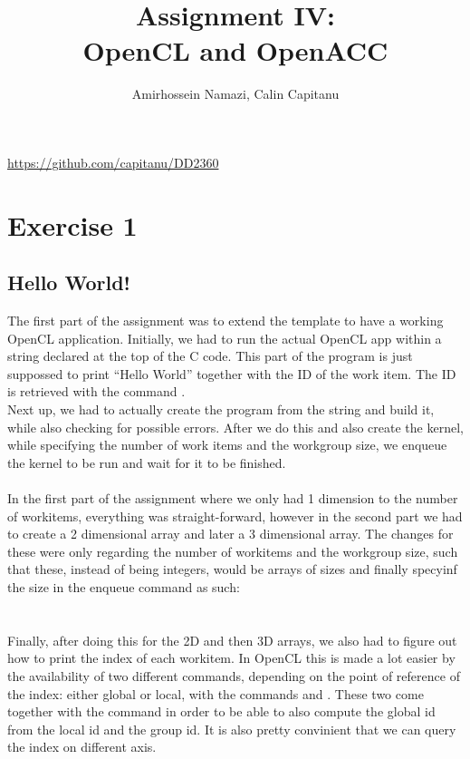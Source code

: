 \documentclass[english]{exam}
\begin{document}
\title{Assignment IV:\\ OpenCL and OpenACC}
\author{Amirhossein Namazi, Calin Capitanu}

\maketitle
\begin{center}
  \url{https://github.com/capitanu/DD2360} \\
\end{center}

\chapter{Exercise 1}
\section*{Hello World!}

The first part of the assignment was to extend the template to have a working OpenCL application. Initially, we had to run the actual OpenCL app within a string declared at the top of the C code. This part of the program is just suppossed to print ``Hello World'' together with the ID of the work item. The ID is retrieved with the command . \\
Next up, we had to actually create the program from the string and build it, while also checking for possible errors. After we do this and also create the kernel, while specifying the number of work items and the workgroup size, we enqueue the kernel to be run and wait for it to be finished.
\\\\
In the first part of the assignment where we only had 1 dimension to the number of workitems, everything was straight-forward, however in the second part we had to create a 2 dimensional array and later a 3 dimensional array. The changes for these were only regarding the number of workitems and the workgroup size, such that these, instead of being integers, would be arrays of sizes and finally specyinf the size in the enqueue command as such:\\
\\\\
Finally, after doing this for the 2D and then 3D arrays, we also had to figure out how to print the index of each workitem. In OpenCL this is made a lot easier by the availability of two different commands, depending on the point of reference of the index: either global or local, with the commands  and . These two come together with the command  in order to be able to also compute the global id from the local id and the group id. It is also pretty convinient that we can query the index on different axis.
\end{document}

